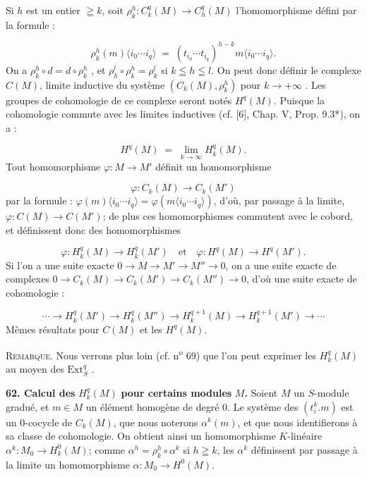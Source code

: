 Si $h$ est un entier $\geqq k$, soit $\rho^h_k: C^q_k(M) \to C^q_h(M)$ l'homomorphisme défini par la formule :

\begin{equation*}
\rho^h_k(m)\langle i_0 \cdots i_q \rangle \;=\; (t_{i_0} \cdots t_{i_q})^{h-k} m\langle i_0 \cdots i_q \rangle.
\end{equation*}
On a $\rho^h_k \circ d = d \circ \rho^h_k$ , et $\rho^l_h \circ \rho^h_k = \rho^l_k$ si $k \leqq h \leqq l$. On peut donc définir le complexe $C(M)$, limite inductive du système $(C_k(M), \rho^h_k)$ pour $k \to +\infty$ . Les groupes de cohomologie de ce complexe seront notés $H^q(M)$. Puisque la cohomologie commute avec les limites inductives (cf. [6], Chap. V, Prop. 9.3*), on a :

\begin{equation*}
H^q(M) \;=\; \lim_{k \to \infty} H^q_k(M).
\end{equation*}
Tout homomorphisme $\varphi: M \to M'$ définit un homomorphisme

\begin{equation*}
\varphi: C_k(M) \to C_k(M')
\end{equation*}
par la formule : $\varphi(m)\langle i_0 \cdots i_q \rangle = \varphi(m\langle i_0 \cdots i_q \rangle)$, d'où, par passage à la limite, $\varphi: C(M) \to C(M')$; de plus ces homomorphismes commutent avec le cobord, et définissent donc des homomorphismes

\begin{equation*}
\varphi: H^q_k(M) \to H^q_k(M') \quad \mathrm{et} \quad \varphi: H^q(M) \to H^q(M').
\end{equation*}
Si l'on a une suite exacte $0 \to M \to M' \to M'' \to 0$, on a une suite exacte de complexes $0 \to C_k(M) \to C_k(M') \to C_k(M'') \to 0$, d'où une suite exacte de cohomologie :

\begin{equation*}
\cdots \to H^q_k(M') \to H^q_k(M'') \to H^{q+1}_k(M) \to H^{q+1}_k(M') \to \cdots
\end{equation*}
Mêmes résultats pour $C(M)$ et les $H^q(M)$.

\textsc{Remarque}. Nous verrons plus loin (cf. n\textsuperscript{o} 69) que l'on peut exprimer les $H^q_k(M)$ au moyen des $\mathrm{Ext}^q_S$ .

\textbf{62. Calcul des} $H^q_k(M)$ \textbf{pour certains modules} $M$\textbf{.} Soient $M$ un $S$-module gradué, et $m \in M$ un élément homogène de degré 0. Le système des $(t^k_i.m)$ est un 0-cocycle de $C_k(M)$, que nous noterons $\alpha^k(m)$, et que nous identifierons à sa classe de cohomologie. On obtient ainsi un homomorphisme $K$-linéaire $\alpha^k: M_0 \to H^0_k(M)$; comme $\alpha^h = \rho^h_k \circ \alpha^k$ si $h \geqq k$, les $\alpha^k$ définissent par passage à la limite un homomorphisme $\alpha: M_0 \to H^0(M)$.

